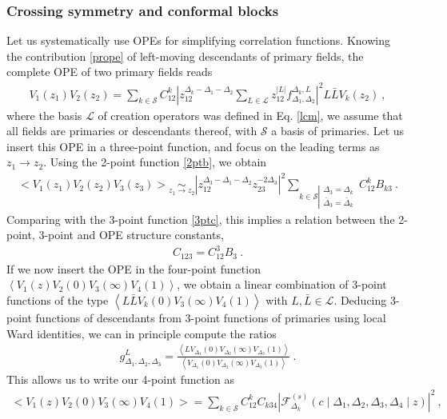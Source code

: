 \documentclass[12pt, a4paper]{article}
\theoremstyle{break}
\begin{document}
\subsubsection{Crossing symmetry and conformal blocks}\label{sec:cscb}

Let us systematically use OPEs for simplifying correlation functions. Knowing the contribution \eqref{prope} of left-moving descendants of primary fields, the complete OPE of two primary fields reads 
\begin{align}
 V_1(z_1)V_2(z_2) = \sum_{k\in\mathcal{S}} C_{12}^k \left|z_{12}^{\Delta_k-\Delta_1-\Delta_2}\sum_{L\in\mathcal{L}} z_{12}^{|L|}f_{\Delta_1,\Delta_2}^{\Delta_k,L}\right|^2 L\bar L V_k(z_2)\ ,
 \label{tope}
\end{align}
where the basis $\mathcal{L}$ of creation operators was defined in Eq. \eqref{lcm},
we assume that all fields are primaries or descendants thereof, with $\mathcal{S}$ a basis of primaries. Let us insert this OPE in a three-point function, and focus on the leading terms as $z_1\to z_2$. Using the 2-point function \eqref{2ptb}, we obtain
\begin{align}
  \Big< V_1(z_1)V_2(z_2)V_3(z_3) \Big> \underset{z_1\to z_2}{\sim} 
  \left|z_{12}^{\Delta_3-\Delta_1-\Delta_2}z_{23}^{-2\Delta_3}\right|^2 
  \sum_{k\in\mathcal{S}\left|\substack{\Delta_3=\Delta_k\\ \bar{\Delta}_3=\bar\Delta_k}\right. }
  C_{12}^k B_{k3}\ .
\end{align}
Comparing with the 3-point function \eqref{3ptc}, this implies a relation between the 2-point, 3-point and OPE structure constants,
\begin{align}
 \boxed{C_{123} = C_{12}^3B_{3}} \ .
 \label{ccb}
\end{align}
If we now insert the OPE in the four-point function $\left<V_1(z)V_2(0)V_3(\infty)V_4(1)\right>$, we obtain a linear combination of 3-point functions of the type $\left<L\bar{L}V_k(0) V_3(\infty)V_4(1)\right>$ with $L,\bar L\in\mathcal{L}$. Deducing 3-point functions of descendants from 3-point functions of primaries using local Ward identities, we can in principle compute the ratios
\begin{align}
 g^L_{\Delta_1,\Delta_2,\Delta_3} = \frac{\left< LV_{\Delta_1}(0) V_{\Delta_2}(\infty)V_{\Delta_3}(1)\right>}{\left< V_{\Delta_1}(0) V_{\Delta_2}(\infty)V_{\Delta_3}(1)\right>}\ .
 \label{gl}
\end{align}
This allows us to write our 4-point function as 
\begin{align}
 \boxed{\Big<V_1(z)V_2(0)V_3(\infty)V_4(1)\Big> = \sum_{k\in\mathcal{S}} C_{12}^k C_{k34} \left|\mathcal{F}^{(s)}_{\Delta_k}\left(c\middle|\Delta_1,\Delta_2,\Delta_3,\Delta_4\middle|z\right)\right|^2}  \ ,
 \label{sdec}
\end{align}
\end{document}

